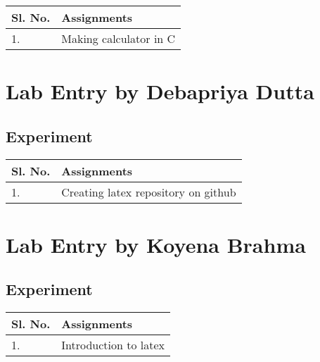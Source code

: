 \documentclass[12pt, a4paper]{article}
\begin{document}
\vspace{0.5cm}
\begin{table}[ht]
\centering
\begin{tabular}{|p{50pt}|p{200pt}|}
\hline
\textbf{Sl. No.} & \textbf{Assignments} \\ \hline
1. & Making calculator in C  \\ \hline
\end{tabular}
\end{table}

\newpage

\usetikzlibrary{calc}

\section{Lab Entry by Debapriya Dutta}
\subsection{Experiment}

\vspace{0.5cm}
\begin{table}[ht]
\centering
\begin{tabular}{|p{50pt}|p{200pt}|}
\hline
\textbf{Sl. No.} & \textbf{Assignments} \\ \hline
1. & Creating latex repository on github \\ \hline
\end{tabular}
\end{table}

\vspace{2.5cm}
\section{Lab Entry by Koyena Brahma}
\subsection{Experiment}

\vspace{0.5cm}
\begin{table}[ht]
\centering
\begin{tabular}{|p{50pt}|p{200pt}|}
\hline
\textbf{Sl. No.} & \textbf{Assignments} \\ \hline
1. & Introduction to latex \\ \hline
\end{tabular}
\end{table}
\end{document}
